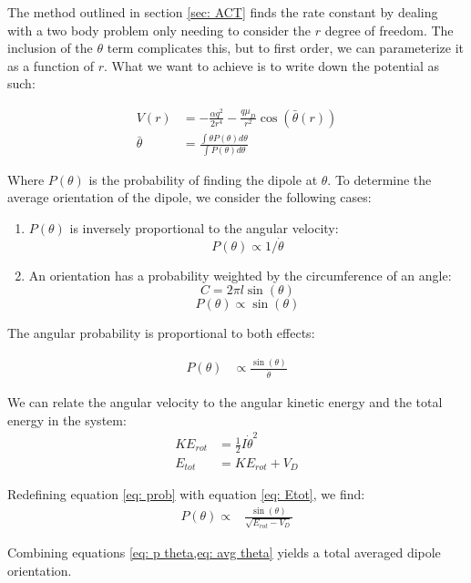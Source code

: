 The method outlined in section \ref{sec: ACT} finds the rate constant by dealing with a two body problem only needing to consider the $r$ degree of freedom. The inclusion of the $\theta$ term complicates this, but to first order, we can parameterize it as a function of $r$. What we want to achieve is to write down the potential as such:

\begin{align}
    V(r) & = -\frac{\alpha q^2}{2r^4} - \frac{q\mu_D}{r^2} \cos\left(\bar{\theta}(r)\right) \nonumber \\
    \bar{\theta} & = \frac{\int \theta P(\theta) d\theta}{\int P(\theta) d\theta} \label{eq: avg theta}
\end{align}

Where $P(\theta)$ is the probability of finding the dipole at $\theta$. To determine the average orientation of the dipole, we consider the following cases:

\begin{enumerate}
	\item $P(\theta)$ is inversely proportional to the angular velocity:
	$$P(\theta) \propto 1/\dot{\theta}$$
	\item An orientation has a probability weighted by the circumference of an angle:
	$$C=2\pi l \sin(\theta)$$
	$$ P(\theta) \propto \sin(\theta) $$
\end{enumerate}

The angular probability is proportional to both effects:

\begin{align}
    P(\theta) & \propto \frac{\sin(\theta)}{\dot{\theta}} \label{eq: prob}
\end{align}

We can relate the angular velocity to the angular kinetic energy and the total energy in the system:
\begin{align}
    KE_{rot} & = \frac{1}{2}I\dot{\theta}^2 \nonumber \\
    E_{tot} & = KE_{rot} + V_D \label{eq: Etot}
\end{align}

Redefining equation \ref{eq: prob} with equation \ref{eq: Etot}, we find:
\begin{align}
    P(\theta) \propto & \frac{\sin(\theta)}{\sqrt{E_{rot}-V_D}} \label{eq: p theta}
\end{align}

Combining equations \cref{eq: p theta,eq: avg theta} yields a total averaged dipole orientation.

